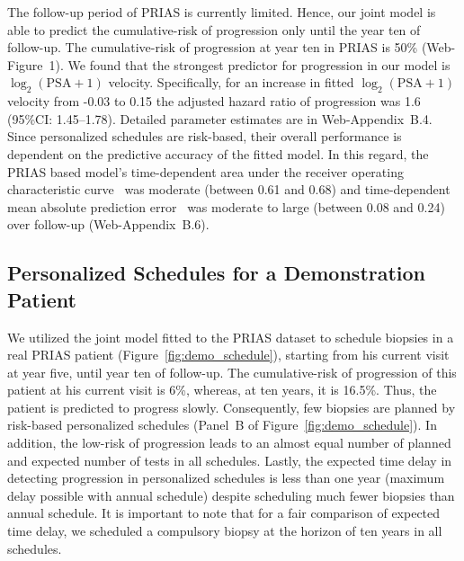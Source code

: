 The follow-up period of PRIAS is currently limited. Hence, our joint model is able to predict the cumulative-risk of progression only until the year ten of follow-up. The cumulative-risk of progression at year ten in PRIAS is 50\% (Web-Figure~1). We found that the strongest predictor for progression in our model is $\log_2(\mbox{PSA} + 1)$ velocity. Specifically, for an increase in fitted $\log_2(\mbox{PSA} + 1)$ velocity from -0.03 to 0.15 the adjusted hazard ratio of progression was 1.6 (95\%CI: 1.45--1.78). Detailed parameter estimates are in Web-Appendix~B.4. Since personalized schedules are risk-based, their overall performance is dependent on the predictive accuracy of the fitted model. In this regard, the PRIAS based model's time-dependent area under the receiver operating characteristic curve~\citep{rizopoulos2011dynamic} was moderate (between 0.61 and 0.68) and time-dependent mean absolute prediction error~\citep{rizopoulos2011dynamic} was moderate to large (between 0.08 and 0.24) over follow-up (Web-Appendix~B.6).

\subsection{Personalized Schedules for a Demonstration Patient}
We utilized the joint model fitted to the PRIAS dataset to schedule biopsies in a real PRIAS patient (Figure~\ref{fig:demo_schedule}), starting from his current visit at year five, until year ten of follow-up. The cumulative-risk of progression of this patient at his current visit is 6\%, whereas, at ten years, it is 16.5\%. Thus, the patient is predicted to progress slowly. Consequently, few biopsies are planned by risk-based personalized schedules (Panel~B of Figure~\ref{fig:demo_schedule}). In addition, the low-risk of progression leads to an almost equal number of planned and expected number of tests in all schedules. Lastly, the expected time delay in detecting progression in personalized schedules is less than one year (maximum delay possible with annual schedule) despite scheduling much fewer biopsies than annual schedule. It is important to note that for a fair comparison of expected time delay, we scheduled a compulsory biopsy at the horizon of ten years in all schedules.


